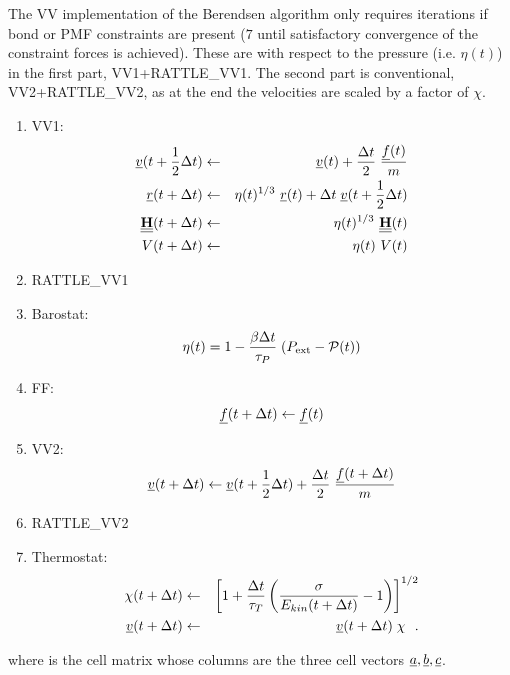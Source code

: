 The VV implementation of the Berendsen algorithm only requires iterations
if bond or PMF constraints are present ($7$ until satisfactory
convergence of the constraint forces is achieved).  These are
with respect to the pressure (i.e. $\eta (t)$) in the first part,
VV1+RATTLE\_VV1.  The second part is conventional, VV2+RATTLE\_VV2,
as at the end the velocities are scaled by a factor of $\chi$.
\begin{enumerate}
\item VV1:
\begin{eqnarray}
\mbox{$\underline{v}$}(t + {1 \over 2} \Delta t) &\leftarrow& \mbox{$\underline{v}$}(t) +
{\Delta t \over 2} \; {\mbox{$\underline{f}$}(t) \over m} \nonumber \\
\mbox{$\underline{r}$}(t + \Delta t) &\leftarrow& \eta (t)^{1/3}~\mbox{$\underline{r}$}(t) + \Delta t \;
\mbox{$\underline{v}$}(t + {1 \over 2} \Delta t) \\
\mbox{$\underline{\underline{\bf H}}$}(t + \Delta t) &\leftarrow&  \eta (t)^{1/3}~\mbox{$\underline{\underline{\bf H}}$}(t) \nonumber \\
V(t + \Delta t) &\leftarrow& \eta (t)~V(t) \nonumber
\end{eqnarray}
\item RATTLE\_VV1
\item Barostat:
\begin{equation}
\eta (t) = 1 - {\beta \Delta t \over \tau_{P}} \; (P_{\rm ext} -
{\cal P}(t))
\end{equation}
\item FF:
\begin{equation}
\mbox{$\underline{f}$}(t + \Delta t) \leftarrow \mbox{$\underline{f}$}(t)
\end{equation}
\item VV2:
\begin{equation}
\mbox{$\underline{v}$}(t + \Delta t) \leftarrow \mbox{$\underline{v}$}(t + {1 \over 2} \Delta t) +
{\Delta t \over 2} \; {\mbox{$\underline{f}$}(t + \Delta t) \over m}
\end{equation}
\item RATTLE\_VV2
\item Thermostat:
\begin{eqnarray}
\chi (t + \Delta t) &\leftarrow& \left[ 1 + {\Delta t \over \tau_{T}}
\left( {\sigma \over E_{kin}(t + \Delta t)} - 1 \right) \right]^{1/2} \nonumber \\
\mbox{$\underline{v}$}(t + \Delta t) &\leftarrow& \mbox{$\underline{v}$}(t + \Delta t) \; \chi~~.
\end{eqnarray}
\end{enumerate}
where  is the cell matrix whose columns are the three cell
vectors $\mbox{$\underline{a}$}, \mbox{$\underline{b}$}, \mbox{$\underline{c}$}$.

